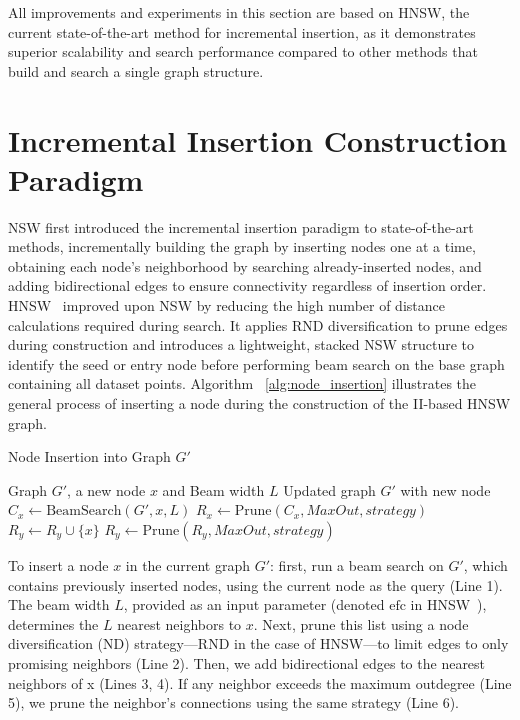 All improvements and experiments in this section are based on HNSW, the current state-of-the-art method for incremental insertion, as it demonstrates superior scalability and search performance compared to other methods that build and search a single graph structure.
\newpage
\section{Incremental Insertion Construction Paradigm}
NSW first introduced the incremental insertion paradigm to state-of-the-art methods, incrementally building the graph by inserting nodes one at a time, obtaining each node’s neighborhood by searching already-inserted nodes, and adding bidirectional edges to ensure connectivity regardless of insertion order. HNSW~\cite{hnsw} improved upon NSW by reducing the high number of distance calculations required during search. It applies RND diversification to prune edges during construction and introduces a lightweight, stacked NSW structure to identify the seed or entry node before performing beam search on the base graph containing all dataset points.
Algorithm ~\ref{alg:node_insertion} illustrates the general process of inserting a node during the construction of the II-based HNSW graph.

 \begin{algorithm}[htb]
\caption{Node Insertion into Graph $G'$}
\label{alg:node_insertion}
\begin{algorithmic}[1]
    \Require Graph $G'$, a new node $x$ and Beam width $L$
    \Ensure Updated graph $G'$ with new node
    \Statex
    \State $C_x \gets \text{BeamSearch}(G', x, L)$ 
    \State $R_x \gets \text{Prune}(C_x, MaxOut, strategy)$ 
        \State $R_y \gets R_y \cup \{ x \}$ 
            \State $R_y \gets \text{Prune}(R_y, MaxOut, strategy)$ 
        \EndIf
    \EndFor
\end{algorithmic}
\end{algorithm}
To insert a node \( x \) in the current graph \( G' \): first, run a beam search on \( G' \), which contains previously inserted nodes, using the current node as the query (Line 1). The beam width $L$, provided as an input parameter (denoted \( \text{efc} \) in HNSW~\cite{hnsw}), determines the \( L \) nearest neighbors to \( x \). Next, prune this list using a node diversification (ND) strategy—RND in the case of HNSW—to limit edges to only promising neighbors (Line 2). Then, we add bidirectional edges to the nearest neighbors of x (Lines 3, 4). If any neighbor exceeds the maximum outdegree (Line 5), we prune the neighbor’s connections using the same strategy (Line 6).

